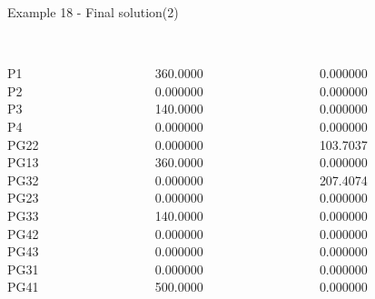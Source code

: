 \begin{frame}{Example 18 - Final solution(2)}

\begin{columns}[t]
\begin{column}{0.3\textwidth}
\\

P1\\
P2\\
P3\\
P4\\
PG22\\
PG13\\
PG32\\
PG23\\
PG33\\
PG42\\
PG43\\
PG31\\
PG41\\
\end{column}
\begin{column}{0.3\textwidth}
\\

360.0000\\
0.000000\\
140.0000\\
0.000000\\
0.000000\\
360.0000\\
0.000000\\
0.000000\\
140.0000\\
0.000000\\
0.000000\\
0.000000\\
500.0000\\
\end{column}  

\begin{column}{0.3\textwidth}
\\
0.000000\\
0.000000\\
0.000000\\
0.000000\\
103.7037\\
0.000000\\
207.4074\\
0.000000\\
0.000000\\
0.000000\\
0.000000\\
0.000000\\
0.000000\\
\end{column}
\end{columns}
\end{frame}


